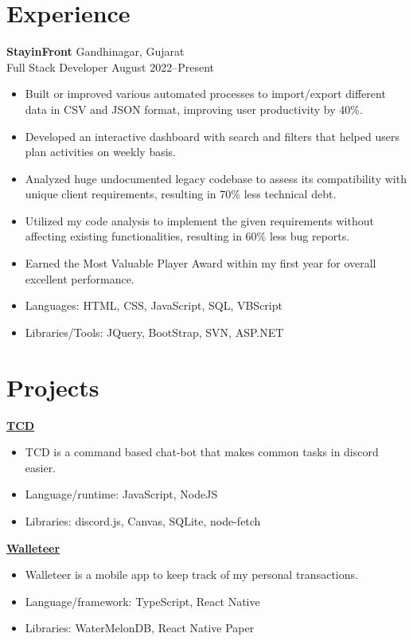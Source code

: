 \documentclass[a4paper,10pt]{article}
\begin{document}
\section{Experience}
\noindent
\textbf{StayinFront} \hfill Gandhinagar, Gujarat \\
Full Stack Developer \hfill August 2022--Present \
\begin{itemize}
    \item Built or improved various automated processes to import/export different data in CSV and JSON format, improving user productivity by 40\%.
    \item Developed an interactive dashboard with search and filters that helped users plan activities on weekly basis.
    \item Analyzed huge undocumented legacy codebase to assess its compatibility with unique client requirements, resulting in 70\% less technical debt.
    \item Utilized my code analysis to implement the given requirements without affecting existing functionalities, resulting in 60\% less bug reports.
    \item Earned the Most Valuable Player Award within my first year for overall excellent performance.
    \item Languages: HTML, CSS, JavaScript, SQL, VBScript
    \item Libraries/Tools: JQuery, BootStrap, SVN, ASP.NET
\end{itemize}

\section{Projects}

\href{https://github.com/jaydamani/TCD}{\textbf{TCD}}
\begin{itemize}
    \item TCD is a command based chat-bot that makes common tasks in discord easier.
    \item Language/runtime: JavaScript, NodeJS
    \item Libraries: discord.js, Canvas, SQLite, node-fetch
\end{itemize}
\href{https://github.com/jaydamani/walleteer}{\textbf{Walleteer}}
\begin{itemize}
    \item Walleteer is a mobile app to keep track of my personal transactions.
    \item Language/framework: TypeScript, React Native
    \item Libraries: WaterMelonDB, React Native Paper
\end{itemize}
\end{document}
